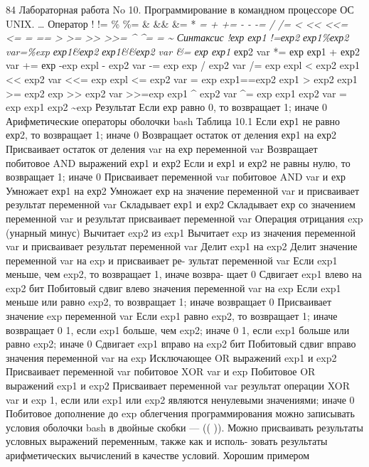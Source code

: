 \documentclass[
  letterpaper,
  DIV=11,
  numbers=noendperiod]{scrartcl}
\begin{document}
84 Лабораторная работа No 10. Программирование в командном процессоре ОС
UNIX. \ldots{} Оператор ! != \% \%= \& \&\& \&= * \emph{= + += - - -= /
/= \textless{} \textless\textless{} \textless\textless= \textless= = ==
\textgreater{} \textgreater= \textgreater\textgreater{}
\textgreater\textgreater= \^{} \^{}= \textbar{} \textbar=
\textbar\textbar{} \textasciitilde{} Синтаксис !ехр ехр1 !=ехр2
ехр1\%ехр2 var=\%exp ехр1\&ехр2 ехр1\&\&ехр2 var \&= ехр ехр1} ехр2 var
*= ехр ехр1 + ехр2 var += ехр -exp expl - exp2 var -= exp exp / exp2 var
/= exp expl \textless{} exp2 exp1 \textless\textless{} exp2 var
\textless\textless= exp expl \textless= exp2 var = exp exp1==exp2 exp1
\textgreater{} exp2 exp1 \textgreater= exp2 exp
\textgreater\textgreater{} exp2 var \textgreater\textgreater=exp exp1
\^{} exp2 var \^{}= exp exp1 \textbar{} exp2 var \textbar= exp exp1
\textbar\textbar{} exp2 \textasciitilde exp Результат Если ехр равно 0,
то возвращает 1; иначе 0 Арифметические операторы оболочки bash Таблица
10.1 Если ехр1 не равно ехр2, то возвращает 1; иначе 0 Возвращает
остаток от деления ехр1 на ехр2 Присваивает остаток от деления var на
ехр переменной var Возвращает побитовое AND выражений ехр1 и ехр2 Если и
ехр1 и ехр2 не равны нулю, то возвращает 1; иначе 0 Присваивает
переменной var побитовое AND var и ехр Умножает ехр1 на ехр2 Умножает
ехр на значение переменной var и присваивает результат переменной var
Складывает ехр1 и ехр2 Складывает ехр со значением переменной var и
результат присваивает переменной var Операция отрицания exp (унарный
минус) Вычитает exp2 из exp1 Вычитает exp из значения переменной var и
присваивает результат переменной var Делит exp1 на exp2 Делит значение
переменной var на exp и присваивает ре- зультат переменной var Если exp1
меньше, чем exp2, то возвращает 1, иначе возвра- щает 0 Сдвигает exp1
влево на exp2 бит Побитовый сдвиг влево значения переменной var на exp
Если exp1 меньше или равно exp2, то возвращает 1; иначе возвращает 0
Присваивает значение exp переменной var Если exp1 равно exp2, то
возвращает 1; иначе возвращает 0 1, если exp1 больше, чем exp2; иначе 0
1, если exp1 больше или равно exp2; иначе 0 Сдвигает exp1 вправо на exp2
бит Побитовый сдвиг вправо значения переменной var на exp Исключающее OR
выражений exp1 и exp2 Присваивает переменной var побитовое XOR var и exp
Побитовое OR выражений exp1 и exp2 Присваивает переменной var результат
операции XOR var и exp 1, если или exp1 или exp2 являются ненулевыми
значениями; иначе 0 Побитовое дополнение до exp облегчения
программирования можно записывать условия оболочки bash в двойные скобки
--- (( )). Можно присваивать результаты условных выражений переменным,
также как и исполь- зовать результаты арифметических вычислений в
качестве условий. Хорошим примером
\end{document}
